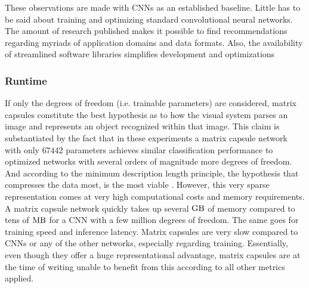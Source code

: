 These observations are made with CNNs as an established baseline. Little has to be said about training and optimizing standard convolutional neural networks. The amount of research published makes it possible to find recommendations regarding myriads of application domains and data formats. Also, the availability of streamlined software libraries simplifies development and optimizations 
\subsubsection{Runtime}
If only the degrees of freedom (i.e. trainable parameters) are considered, matrix capsules constitute the best hypothesis as to how the visual system parses an image and represents an object recognized within that image. This claim is substantiated by the fact that in these experiments a matrix capsule network with only $\num{67442}$ parameters achieves similar classification performance to optimized networks with several orders of magnitude more degrees of freedom. And according to the minimum description length principle, the hypothesis that compresses the data most, is the most viable \cite{ rissanen1978modeling}. However, this very sparse representation comes at very high computational costs and memory requirements. A matrix capsule network quickly takes up several $\si{\giga\byte}$ of memory compared to tens of $\si{\mega\byte}$ for a CNN with a few million degrees of freedom. The same goes for training speed and inference latency. Matrix capsules are very slow compared to CNNs or any of the other networks, especially regarding training. Essentially, even though they offer a huge representational advantage, matrix capsules are at the time of writing unable to benefit from this according to all other metrics applied.

